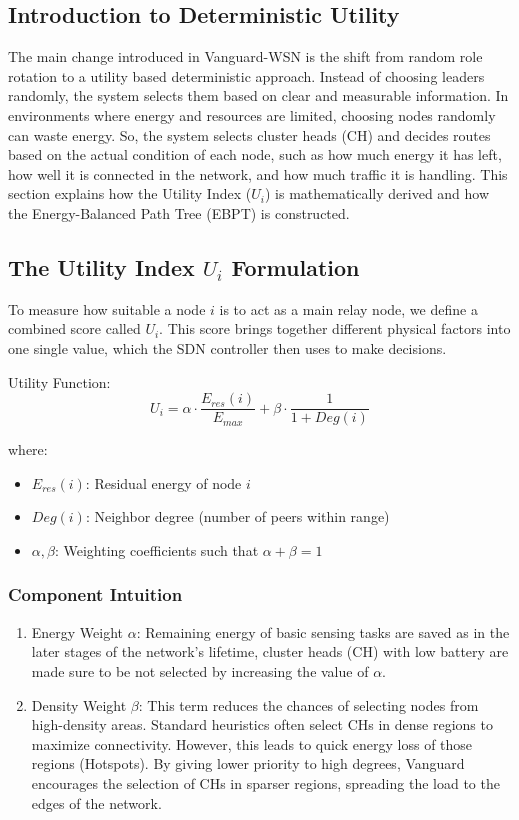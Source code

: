 \documentclass[conference]{IEEEtran}
\begin{document}
\subsection{Introduction to Deterministic Utility}
The main change introduced in Vanguard-WSN is the shift from random role rotation to a utility based deterministic approach. Instead of choosing leaders randomly, the system selects them based on clear and measurable information. In environments where energy and resources are limited, choosing nodes randomly can waste energy. So, the system selects cluster heads (CH) and decides routes based on the actual condition of each node, such as how much energy it has left, how well it is connected in the network, and how much traffic it is handling. This section explains how the Utility Index ($U_i$) is mathematically derived and how the Energy-Balanced Path Tree (EBPT) is constructed.

\subsection{The Utility Index $U_i$ Formulation}
To measure how suitable a node $i$ is to act as a main relay node, we define a combined score called $U_i$. This score brings together different physical factors into one single value, which the SDN controller then uses to make decisions.

Utility Function:
\begin{equation}
U_i = \alpha \cdot \frac{E_{res}(i)}{E_{max}} + \beta \cdot \frac{1}{1 + Deg(i)}
\end{equation}

where:
\begin{itemize}
    \item $E_{res}(i)$: Residual energy of node $i$
    \item $Deg(i)$: Neighbor degree (number of peers within range)
    \item $\alpha, \beta$: Weighting coefficients such that $\alpha + \beta = 1$
\end{itemize}

\subsubsection{Component Intuition}
\begin{enumerate}
    \item Energy Weight $\alpha$: Remaining energy of basic sensing tasks are saved as in the later stages of the network's lifetime, cluster heads (CH) with low battery are made sure to be not selected by increasing the value of $\alpha$.
    \item Density Weight $\beta$: This term reduces the chances of selecting nodes from high-density areas. Standard heuristics often select CHs in dense regions to maximize connectivity. However, this leads to quick energy loss of those regions (Hotspots). By giving lower priority to high degrees, Vanguard encourages the selection of CHs in sparser regions, spreading the load to the edges of the network.
\end{enumerate}
\end{document}
